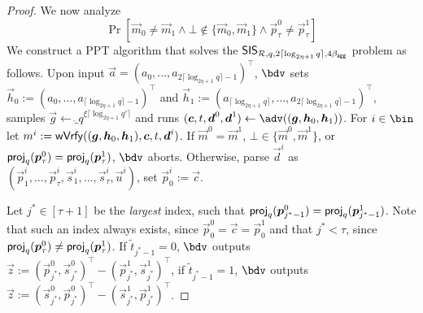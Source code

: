 \begin{proof}
  We now analyze 
  \[
    \Pr[\vec{m}_0\neq \vec{m}_1 \land \bot\not\in\{\vec{m}_0,\vec{m}_1\} \land \vec{p}_\tau^0 \neq \vec{p}_\tau^1]
  \]
  We construct a PPT algorithm that solves the $\mathsf{SIS}_{\mathcal{R},q,2\lceil\log_{2\eta+1} q\rceil,4\beta_{\mathsf{agg}}}$ problem as follows.
  Upon input $\vec{a}=(a_0,\dots,a_{2\lceil\log_{2\eta+1} q\rceil-1})^\intercal$, $\bdv$ sets $\vec{h}_0:=(a_0,\dots,a_{\lceil\log_{2\eta+1} q\rceil-1})^\intercal$ and $\vec{h}_1 := (a_{\lceil\log_{2\eta+1} q\rceil},\dots,a_{2\lceil\log_{2\eta+1} q\rceil-1})^\intercal$, samples $\vec{g} \gets \ring_q^{\xi\lceil\log_{2\eta+1} q'\rceil}$ and runs $(\vec{c},t,\vec{d}^0,\vec{d}^1) \gets \adv((\vec{g},\vec{h}_0,\vec{h}_1))$.
  For $i\in\bin$ let $m^i := \mathsf{wVrfy}((\boldsymbol{g},\boldsymbol{h}_0,\boldsymbol{h}_1),\boldsymbol{c},t,\boldsymbol{d}^i)$.
  If $\vec{m}^0 = \vec{m}^1$, $\bot\in\{\vec{m}^0,\vec{m}^1\}$, or $\mathsf{proj}_q(\boldsymbol{p}_\tau^0) = \mathsf{proj}_q(\boldsymbol{p}_\tau^1)$, $\bdv$ aborts.
  Otherwise, parse $\vec{d}^i$ as $(\vec{p}^i_1,\dots,\vec{p}^i_{\tau},\vec{s}^i_1,\dots,\vec{s}^i_\tau,\vec{u}^i)$, set $\vec{p}^i_0 := \vec{c}$.
  
  Let $j^*\in [\tau+1]$ be the \emph{largest} index, such that $\mathsf{proj}_q(\boldsymbol{p}^0_{j^*-1})=\mathsf{proj}_q(\boldsymbol{p}^1_{j^*-1})$.
  Note that such an index always exists, since $\vec{p}^0_0 = \vec{c} = \vec{p}^1_0$ and that $j^* < \tau$, since $\mathsf{proj}_q(\boldsymbol{p}_\tau^0) \neq \mathsf{proj}_q(\boldsymbol{p}_\tau^1)$.
  If $\tilde t_{j^*-1} = 0$, $\bdv$ outputs $
  \vec{z}:=(\vec{p}_{j^*}^0, \vec{s}_{j^*}^0)^\intercal - (\vec{p}_{j^*}^1, \vec{s}_{j^*}^1)^\intercal$, if $\tilde t_{j^*-1} = 1$, $\bdv$ outputs $\vec{z}:=(\vec{s}_{j^*}^0, \vec{p}_{j^*}^0)^\intercal - (\vec{s}_{j^*}^1, \vec{p}_{j^*}^1)^\intercal$.
  

\end{proof}

